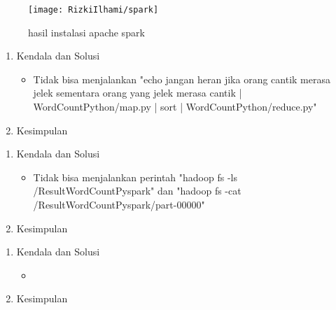 \begin{figure}[!ht]
\texttt{[image: RizkiIlhami/spark]}
\caption{hasil instalasi apache spark }
\label{gam:hasil instalasi spark}
\end{figure}

\clearpage
{}
\begin{enumerate}
\item Kendala dan Solusi

\begin{itemize}
\item Tidak bisa menjalankan {\color{red}"echo jangan heran jika orang cantik merasa jelek sementara
orang yang jelek merasa cantik | WordCountPython/map.py |
sort | WordCountPython/reduce.py"}
\end{itemize}


\item Kesimpulan

\end{enumerate}

\clearpage
{}
\begin{enumerate}
\item Kendala dan Solusi

\begin{itemize}
\item Tidak bisa menjalankan perintah {\color{red}"hadoop fs -ls /ResultWordCountPyspark"} dan {\color{red}"hadoop fs -cat /ResultWordCountPyspark/part-00000"}
\end{itemize}


\item Kesimpulan

\end{enumerate}

\clearpage
{}
\begin{enumerate}
\item Kendala dan Solusi

\begin{itemize}
\item
\end{itemize}


\item Kesimpulan

\end{enumerate}
	